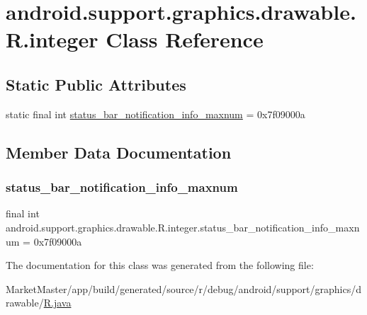\hypertarget{classandroid_1_1support_1_1graphics_1_1drawable_1_1R_1_1integer}{}\section{android.\+support.\+graphics.\+drawable.\+R.\+integer Class Reference}
\label{classandroid_1_1support_1_1graphics_1_1drawable_1_1R_1_1integer}
\subsection*{Static Public Attributes}
\begin{DoxyCompactItemize}
\item 
static final int \mbox{\hyperlink{classandroid_1_1support_1_1graphics_1_1drawable_1_1R_1_1integer_a3940dbc80d681bc0c63c0e82e05868c6}{status\+\_\+bar\+\_\+notification\+\_\+info\+\_\+maxnum}} = 0x7f09000a
\end{DoxyCompactItemize}


\subsection{Member Data Documentation}
\mbox{\label{classandroid_1_1support_1_1graphics_1_1drawable_1_1R_1_1integer_a3940dbc80d681bc0c63c0e82e05868c6}} 
\subsubsection{\texorpdfstring{status\+\_\+bar\+\_\+notification\+\_\+info\+\_\+maxnum}{status\_bar\_notification\_info\_maxnum}}
{\footnotesize\ttfamily final int android.\+support.\+graphics.\+drawable.\+R.\+integer.\+status\+\_\+bar\+\_\+notification\+\_\+info\+\_\+maxnum = 0x7f09000a\hspace{0.3cm}{\ttfamily [static]}}



The documentation for this class was generated from the following file\+:\begin{DoxyCompactItemize}
\item 
Market\+Master/app/build/generated/source/r/debug/android/support/graphics/drawable/\mbox{\hyperlink{debug_2android_2support_2graphics_2drawable_2R_8java}{R.\+java}}\end{DoxyCompactItemize}
